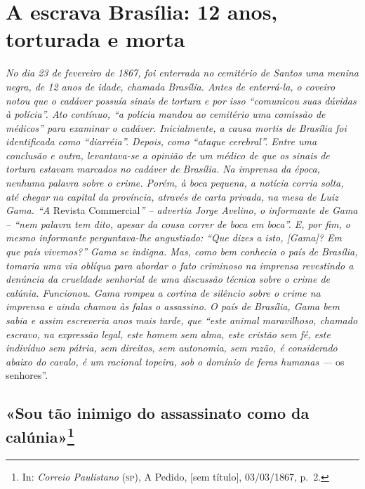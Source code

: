 \part{A escrava Brasília: 12 anos, torturada e morta}

\begin{argumento}
\emph{No dia 23 de fevereiro de 1867, foi enterrada no cemitério de
Santos uma menina negra, de 12 anos de idade, chamada Brasília. Antes de
enterrá-la, o coveiro notou que o cadáver possuía sinais de tortura e
por isso ``comunicou suas dúvidas à polícia''. Ato contínuo, ``a polícia
mandou ao cemitério uma comissão de médicos'' para examinar o cadáver.
Inicialmente, a \emph{causa mortis} de Brasília foi identificada como
``diarréia''. Depois, como ``ataque cerebral''. Entre uma conclusão e outra,
levantava-se a opinião de um médico de que os sinais de tortura estavam
marcados no cadáver de Brasília. Na imprensa da época, nenhuma palavra
sobre o crime. Porém, à boca pequena, a notícia corria solta, até chegar
na capital da província, através de carta privada, na mesa de Luiz Gama.
``A} Revista Commercial\emph{'' -- advertia Jorge Avelino, o informante de
Gama -- ``nem palavra tem dito, apesar da cousa correr de boca em boca''.
E, por fim, o mesmo informante perguntava-lhe angustiado: ``Que dizes a
isto, {[}Gama{]}? Em que país vivemos?'' Gama se indigna. Mas, como bem
conhecia o país de Brasília, tomaria uma via oblíqua para abordar o fato
criminoso na imprensa revestindo a denúncia da crueldade senhorial de
uma discussão técnica sobre o crime de calúnia. Funcionou. Gama rompeu a
cortina de silêncio sobre o crime na imprensa e ainda chamou às falas o
assassino. O país de Brasília, Gama bem sabia e assim escreveria anos
mais tarde, que ``este animal maravilhoso, chamado escravo, na expressão
legal, este homem sem alma, este cristão sem fé, este indivíduo sem
pátria, sem direitos, sem autonomia, sem razão, é considerado abaixo do
cavalo, é um racional topeira, sob o domínio de feras humanas ---} os
senhores''.
\end{argumento}

\chapter{«Sou tão inimigo do assassinato como da
calúnia»\footnote{In: \emph{Correio Paulistano} (\textsc{sp}), A Pedido,
  {[}sem título{]}, 03/03/1867, p.~2.}}

